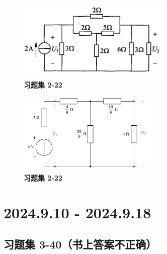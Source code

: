 \documentclass[UTF8]{report}
\theoremstyle{MyLineTheoremStyle} %
\theoremstyle{MyBlockTheoremStyle} %
\theoremstyle{MySubsubsectionStyle} %
\begin{document}
\noindent\begin{minipage}{0.49\textwidth}
\begin{figure}[H]\centering
\includegraphics[height=110pt]{assets/2/0c8d1f0fb90ef6983c0aef6451919e4b.jpg}
\caption{\textbf{习题集 2-22}}
\end{figure}
\end{minipage}\hfill
\begin{minipage}{0.49\textwidth}
\begin{figure}[H]\centering
\includegraphics[height=110pt]{assets/2/2-22.drawio.pdf}
\caption{\textbf{习题集 2-22}}\label{2-22}
\end{figure}
\end{minipage}




\chapter{2024.9.10 - 2024.9.18}\thispagestyle{fancy}


\section{习题集 3-40（书上答案不正确）}
\end{document}
